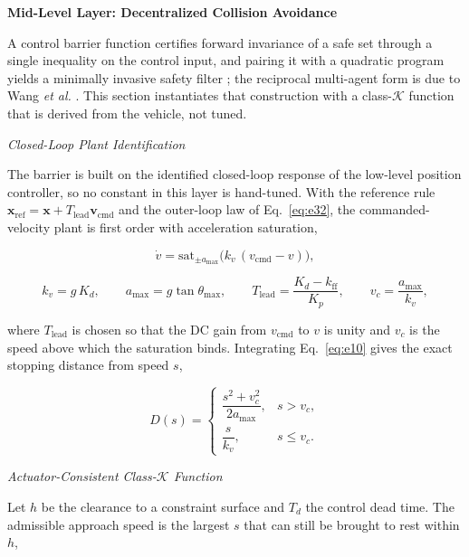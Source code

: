 \documentclass[10pt,letterpaper]{article}
\newcommand{\headingtwo}[1]{%
    \par\vspace{7pt}%
    {\centering\fontsize{12}{14}\selectfont\bfseries #1\par}%
    \vspace{3pt}\noindent\ignorespaces}
\newcommand{\headingthree}[1]{%
    \par\vspace{6pt}%
    {\centering\fontsize{10}{12}\selectfont\itshape #1\par}%
    \vspace{2pt}\noindent\ignorespaces}
\newcommand{\cit}[1]{\cite{#1}}
\newcommand{\citt}[2]{\cite{#1,#2}}
\begin{document}
\headingtwo{Mid-Level Layer: Decentralized Collision Avoidance}

A control barrier function certifies forward invariance of a safe set through a single
inequality on the control input, and pairing it with a quadratic program yields a minimally
invasive safety filter \citt{amesControlBarrierFunction2017}{amesControlBarrierFunctions2019};
the reciprocal multi-agent form is due to Wang \emph{et al.}
\cit{wangSafetyBarrierCertificates2017}. This section instantiates that construction with a
class-$\mathcal{K}$ function that is derived from the vehicle, not tuned.

\headingthree{Closed-Loop Plant Identification}

The barrier is built on the identified closed-loop response of the low-level position
controller, so no constant in this layer is hand-tuned. With the reference rule
$\mathbf{x}_{\mathrm{ref}}=\mathbf{x}+T_{\mathrm{lead}}\mathbf{v}_{\mathrm{cmd}}$ and the
outer-loop law of Eq.~\eqref{eq:e32}, the commanded-velocity plant is first order with acceleration
saturation,

\begin{equation}
    \label{eq:e10}
    \dot v=\mathrm{sat}_{\pm a_{\max}}\bigl(k_v\,(v_{\mathrm{cmd}}-v)\bigr),
\end{equation}

\begin{equation}
    \label{eq:e11}
    k_v=g\,K_d,\qquad
    a_{\max}=g\tan\theta_{\max},\qquad
    T_{\mathrm{lead}}=\frac{K_d-k_{\mathrm{ff}}}{K_p},\qquad
    v_c=\frac{a_{\max}}{k_v},
\end{equation}

where $T_{\mathrm{lead}}$ is chosen so that the DC gain from $v_{\mathrm{cmd}}$ to $v$ is
unity and $v_c$ is the speed above which the saturation binds. Integrating Eq.~\eqref{eq:e10} gives the
exact stopping distance from speed $s$,

\begin{equation}
    \label{eq:e12}
    D(s)=
    \begin{cases}
        \dfrac{s^2+v_c^2}{2a_{\max}}, & s>v_c,    \\[8pt]
        \dfrac{s}{k_v},               & s\le v_c.
    \end{cases}
\end{equation}

\headingthree{Actuator-Consistent Class-$\mathcal{K}$ Function}

Let $h$ be the clearance to a constraint surface and $T_d$ the control dead time. The
admissible approach speed is the largest $s$ that can still be brought to rest within $h$,
\end{document}
